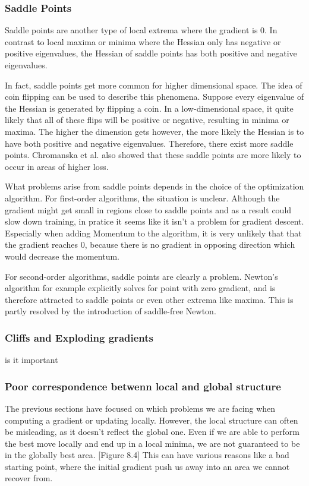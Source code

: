 \subsubsection{Saddle Points}\label{prob:3}
Saddle points are another type of local extrema where the gradient is 0. In
contrast to local maxima or minima where the Hessian only has negative or
positive eigenvalues, the Hessian of saddle points has both positive and
negative eigenvalues.

In fact, saddle points get more common for higher dimensional space. The idea of
coin flipping can be used to describe this phenomena. Suppose every eigenvalue
of the Hessian is generated by flipping a coin. In a low-dimensional space, it
quite likely that all of these flips will be positive or negative, resulting in
minima or maxima. The higher the dimension gets however, the more likely the
Hessian is to have both positive and negative eigenvalues. Therefore, there
exist more saddle points. Chromanska et al. also showed that these saddle points
are more likely to occur in areas of higher loss.

What problems arise from saddle points depends in the choice of the optimization
algorithm. For first-order algorithms, the situation is unclear. Although the
gradient might get small in regions close to saddle points and as a result could
slow down training, in pratice it seems like it isn't a problem for gradient
descent. Especially when adding Momentum to the algorithm, it is very unlikely
that that the gradient reaches 0, because there is no gradient in opposing
direction which would decrease the momentum.

For second-order algorithms, saddle points are clearly a problem. Newton's
algorithm for example explicitly solves for point with zero gradient, and is
therefore attracted to saddle points or even other extrema like maxima. This is
partly resolved by the introduction of saddle-free Newton. 


\subsubsection{Cliffs and Exploding gradients}
is it important

\subsubsection{Poor correspondence betwenn local and global
structure}\label{prob:5}

The previous sections have focused on which problems we are facing when
computing a gradient or updating locally. However, the local structure can often
be misleading, as it doesn't reflect the global one. Even if we are able to
perform the best move locally and end up in a local minima, we are not
guaranteed to be in the globally best area. [Figure 8.4] This can have various
reasons like a bad starting point, where the initial gradient push us away into
an area we cannot recover from.

